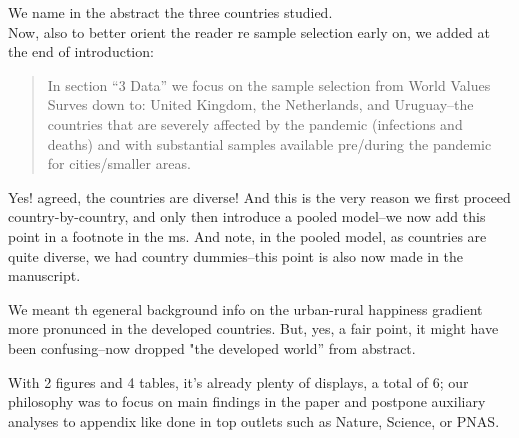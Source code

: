 We name in the abstract the three countries studied.\\ %

Now, also to better orient the reader re sample selection early on, we added at
the end of introduction:\\

\begin{quote}
  In section ``3 Data'' we focus on the sample selection from World Values
  Surves down to: United Kingdom, the Netherlands, and Uruguay--the countries
  that are severely affected by the pandemic (infections and deaths) and with
  substantial samples available pre/during the pandemic for cities/smaller areas.
\end{quote}

Yes! agreed, the countries are diverse! And this is the very reason  we first
proceed country-by-country, and only then introduce a pooled model--we now add
this point in a footnote in the ms. And note, in the pooled model, as countries
are quite diverse, we had country dummies--this point is also now made in the
manuscript. 


We meant th egeneral background info on the urban-rural happiness gradient more
pronunced in the developed countries. But, yes, a fair point, it might have been
confusing--now dropped "the developed world'' from abstract.\\


With 2 figures and 4 tables, it's already plenty of displays, a total of 6; our
philosophy was to focus on main findings in the paper and postpone auxiliary
analyses to appendix like done in top outlets such as Nature, Science, or
PNAS.\\

